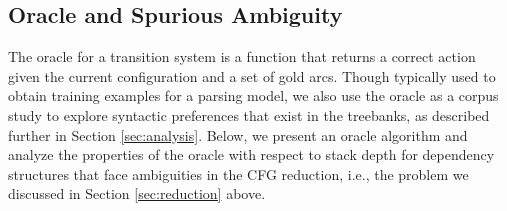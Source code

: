 \documentclass[english]{jnlp_1.4}
\begin{document}
\subsection{Oracle and Spurious Ambiguity}
\label{sec:oracle}

The oracle for a transition system is a function that returns a correct action given the current configuration and a set of gold arcs.
Though typically used to obtain training examples for a parsing model, we also use the oracle as a corpus study to explore syntactic preferences that exist in the treebanks, as described further in Section \ref{sec:analysis}.
Below, we present an oracle algorithm and analyze the properties of the oracle with respect to stack depth for dependency structures that face ambiguities in the CFG reduction, i.e., the problem we discussed in Section \ref{sec:reduction} above.
\end{document}
